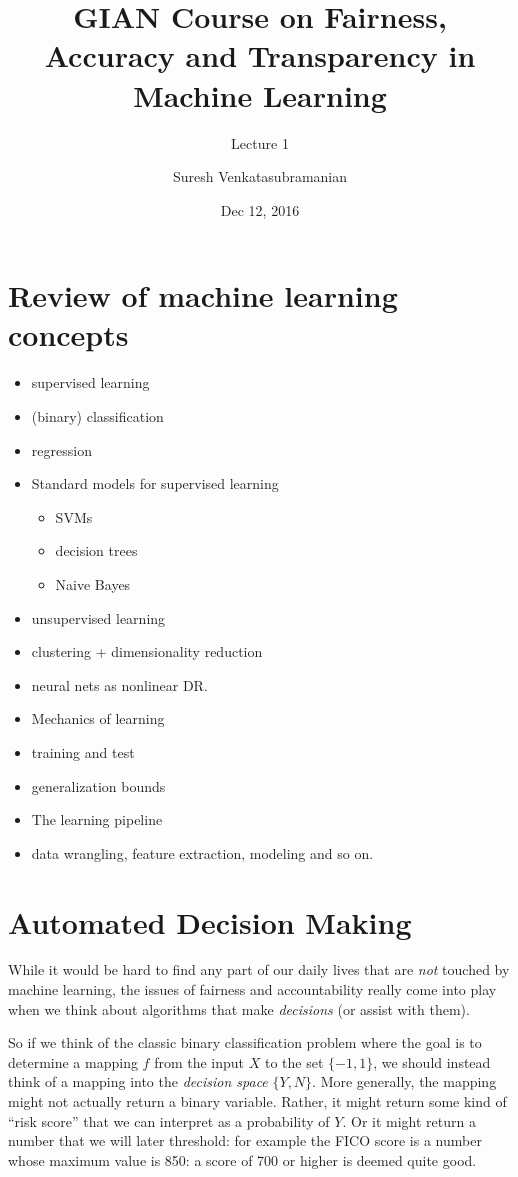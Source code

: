 \documentclass[11pt]{paper}
\title{GIAN Course on Fairness, Accuracy and Transparency in Machine Learning}
\subtitle{Lecture 1}
\author{Suresh Venkatasubramanian}
\date{Dec 12, 2016}
\begin{document}
\maketitle

\section{Review of machine learning
concepts}\label{review-of-machine-learning-concepts}

\begin{itemize}
\itemsep1pt\parskip0pt
\item
  supervised learning
\item
  (binary) classification
\item
  regression
\item
  Standard models for supervised learning

  \begin{itemize}
  \itemsep1pt\parskip0pt
  \item
    SVMs
  \item
    decision trees
  \item
    Naive Bayes
  \end{itemize}
\item
  unsupervised learning
\item
  clustering + dimensionality reduction
\item
  neural nets as nonlinear DR.
\item
  Mechanics of learning
\item
  training and test
\item
  generalization bounds
\item
  The learning pipeline
\item
  data wrangling, feature extraction, modeling and so on.
\end{itemize}

\section{Automated Decision Making}\label{automated-decision-making}

While it would be hard to find any part of our daily lives that are
\emph{not} touched by machine learning, the issues of fairness and
accountability really come into play when we think about algorithms that
make \emph{decisions} (or assist with them).

So if we think of the classic binary classification problem where the
goal is to determine a mapping $f $ from the input $X$ to the set
$\{-1, 1\}$, we should instead think of a mapping into the
\emph{decision space} $\{Y, N\}$. More generally, the mapping might not
actually return a binary variable. Rather, it might return some kind of
``risk score'' that we can interpret as a probability of $Y$. Or it
might return a number that we will later threshold: for example the FICO
score is a number whose maximum value is 850: a score of 700 or higher
is deemed quite good.
\end{document}
